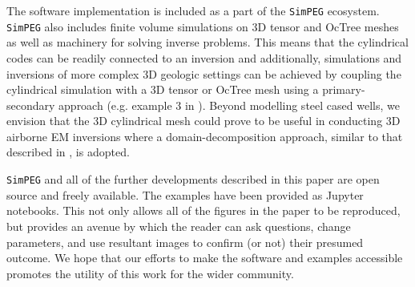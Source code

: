 The software implementation is included as a part of the \texttt{SimPEG} ecosystem. \texttt{SimPEG} also includes finite volume simulations on 3D tensor and OcTree meshes as well as machinery for solving inverse problems. This means that the cylindrical codes can be readily connected to an inversion and additionally, simulations and inversions of more complex 3D geologic settings can be achieved by coupling the cylindrical simulation with a 3D tensor or OcTree mesh using a primary-secondary approach (e.g. example 3 in \cite{Heagy2017}). Beyond modelling steel cased wells, we envision that the 3D cylindrical mesh could prove to be useful in conducting 3D airborne EM inversions where a domain-decomposition approach, similar to that described in \cite{Yang2014}, is adopted.

\texttt{SimPEG} and all of the further developments described in this paper are open source and freely available. The examples have been provided as Jupyter notebooks. This not only allows all of the figures in the paper to be reproduced, but provides an avenue by which the reader can ask questions, change parameters, and use resultant images to confirm (or not) their presumed outcome. We hope that our efforts to make the software and examples accessible promotes the utility of this work for the wider community.


